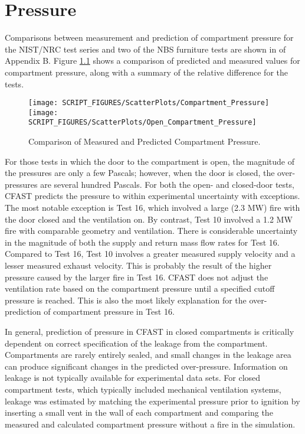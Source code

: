 \chapter{Pressure}

Comparisons between measurement and prediction of compartment pressure for the NIST/NRC test series and two of the NBS furniture tests are shown in of Appendix B.  Figure \ref{fig:Pressure_Scatter} shows a comparison of predicted and measured values for compartment pressure, along with a summary of the relative difference for the tests.
\label{Compartment Over-Pressure}
\label{Open Compartment Over-Pressure}

\begin{figure}
\begin{center}
\texttt{[image: SCRIPT\_FIGURES/ScatterPlots/Compartment\_Pressure]}  \\
\texttt{[image: SCRIPT\_FIGURES/ScatterPlots/Open\_Compartment\_Pressure]}
\end{center}
\caption{Comparison of Measured and Predicted Compartment Pressure.} \label{fig:Pressure_Scatter}
\end{figure}

For those tests in which the door to the compartment is open, the magnitude of the pressures are only a few Pascals; however, when the door is closed, the over-pressures are several hundred Pascals.  For both the open- and closed-door tests, CFAST predicts the pressure to within experimental uncertainty with exceptions.  The most notable exception is Test 16, which involved a large (2.3 MW) fire with the door closed and the ventilation on.  By contrast, Test 10 involved a 1.2 MW fire with comparable geometry and ventilation.  There is considerable uncertainty in the magnitude of both the supply and return mass flow rates for Test 16.  Compared to Test 16, Test 10 involves a greater measured supply velocity and a lesser measured exhaust velocity.  This is probably the result of the higher pressure caused by the larger fire in Test 16.  CFAST does not adjust the ventilation rate based on the compartment pressure until a specified cutoff pressure is reached.  This is also the most likely explanation for the over-prediction of compartment pressure in Test 16.

In general, prediction of pressure in CFAST in closed compartments is critically dependent on correct specification of the leakage from the compartment.  Compartments are rarely entirely sealed, and small changes in the leakage area can produce significant changes in the predicted over-pressure. Information on leakage is not typically available for experimental data sets. For closed compartment tests, which typically included mechanical ventilation systems, leakage was estimated by matching the experimental pressure prior to ignition by inserting a small vent in the wall of each compartment and comparing the measured and calculated compartment pressure without a fire in the simulation.


